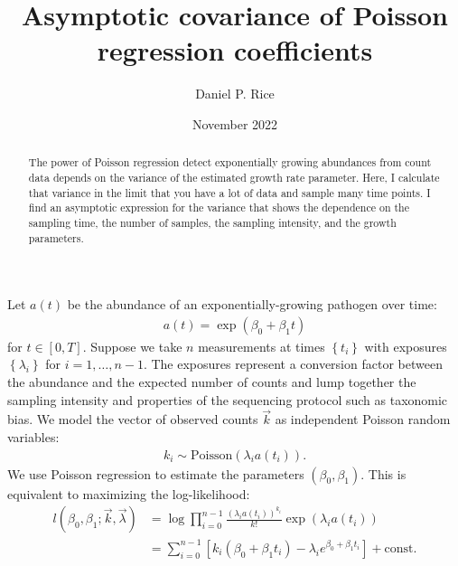 \documentclass[12pt, letterpaper]{article}
\title{Asymptotic covariance of Poisson regression coefficients}
\author{Daniel P. Rice}
\date{November 2022}
\begin{document}
\maketitle

\begin{abstract}
    The power of Poisson regression detect exponentially growing abundances from count data depends on the variance of the estimated growth rate parameter. Here, I calculate that variance in the limit that you have a lot of data and sample many time points. I find an asymptotic expression for the variance that shows the dependence on the sampling time, the number of samples, the sampling intensity, and the growth parameters.
\end{abstract}

Let $a(t)$ be the abundance of an exponentially-growing pathogen over time:
\begin{align}
    a(t) = \exp(\beta_0 + \beta_1 t)
\end{align}
for $t \in \left[ 0, T\right]$.
Suppose we take $n$ measurements at times $\left\{t_i\right\}$ with exposures $\left\{\lambda_i\right\}$ for $i = 1, \ldots, n-1$.
The exposures represent a conversion factor between the abundance and the expected number of counts and lump together the sampling intensity and properties of the sequencing protocol such as taxonomic bias.
We model the vector of observed counts $\vec{k}$ as independent Poisson random variables:
\begin{align}
    k_i \sim \text{Poisson}(\lambda_i a(t_i)).
\end{align}
We use Poisson regression to estimate the parameters $(\beta_0, \beta_1)$.
This is equivalent to maximizing the log-likelihood:
\begin{align}
    l(\beta_0, \beta_1; \vec{k}, \vec{\lambda})
    & = \log \prod_{i=0}^{n-1} \frac{{(\lambda_i a(t_i))}^{k_i}}{k!} \exp(\lambda_i a(t_i))\\
    & = \sum_{i=0}^{n-1} \left[k_i(\beta_0 + \beta_1 t_i) - \lambda_i e^{\beta_0 + \beta_1 t_i} \right] + \text{const.}
\end{align}
\end{document}
